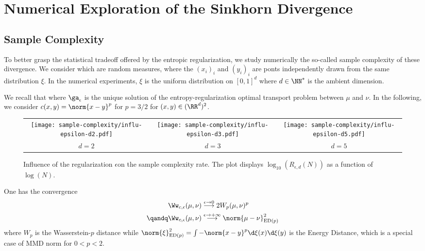 

\section{Numerical Exploration of the Sinkhorn Divergence}


\subsection{Sample Complexity}

To better grasp the statistical tradeoff offered by the entropic regularization, we study numerically the so-called sample complexity of these divergence.
%
We consider 
which are random measures, where the $(x_i)_i$ and $(y_i)_i$ are ponts independently drawn from the same distribution $\xi$.
%
In the numerical experiments, $\xi$ is the uniform distribution on $[0,1]^d$ where $d \in \NN^*$ is the ambient dimension. 

We recall that 
where $\ga_{\epsilon}$ is the unique solution of the entropy-regularization optimal transport problem between $\mu$ and $\nu$.
%
In the following, we consider $c(x,y)=\norm{x-y}^p$ for $p=3/2$ for $(x,y) \in (\RR^{d})^2$.


\begin{figure*}
\centering
\begin{tabular}{c@{}c@{}c}
\texttt{[image: sample-complexity/influ-epsilon-d2.pdf]}&
\texttt{[image: sample-complexity/influ-epsilon-d3.pdf]}&
\texttt{[image: sample-complexity/influ-epsilon-d5.pdf]}\\
$d=2$& $d=3$ & $d=5$\\
\end{tabular}%
\caption{ Influence of the regularization $\epsilon$on the sample complexity rate. The plot displays $\log_{10}(R_{\epsilon,d}(N))$ as a function of $\log(N)$. 
\label{fig:influ-eps}}
\end{figure*}

One has the convergence
\begin{align*}
	\Ww_{c,\epsilon}(\mu,\nu) &\overset{\epsilon\rightarrow 0}{\longrightarrow} 2 W_p(\mu,\nu)^p \\
	\qandq
	\Ww_{c,\epsilon}(\mu,\nu) &\overset{\epsilon\rightarrow +\infty}{\longrightarrow} \norm{\mu-\nu}_{\text{ED}(p)}^2
\end{align*}
where $W_p$ is the Wasserstein-$p$ distance while $\norm{\xi}_{\text{ED}(p)}^2  = \int -\norm{x-y}^p \d\xi(x)\d\xi(y)$ is the Energy Distance, which is a special case of MMD norm for $0<p<2$.

